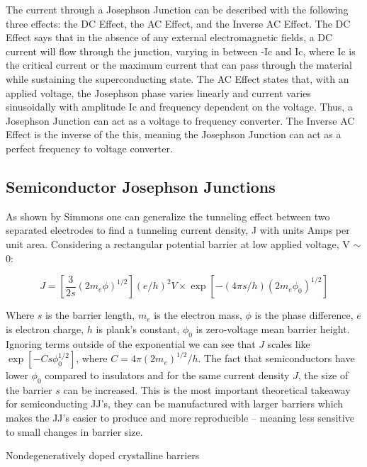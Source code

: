 \documentclass[conf]{new-aiaa}
\begin{document}
The current through a Josephson Junction can be described with the following three effects: the DC Effect, the AC Effect, and the Inverse AC Effect. The DC Effect says that in the absence of any external electromagnetic fields, a DC current will flow through the junction, varying in between -Ic and Ic, where Ic is the critical current or the maximum current that can pass through the material while sustaining the superconducting state. The AC Effect states that, with an applied voltage, the Josephson phase varies linearly and current varies sinusoidally with amplitude Ic and frequency dependent on the voltage. Thus, a Josephson Junction can act as a voltage to frequency converter. The Inverse AC Effect is the inverse of the this, meaning the Josephson Junction can act as a perfect frequency to voltage converter. 



\subsection{Semiconductor Josephson Junctions}

As shown by Simmons \cite{simmons1963generalized} one can generalize the tunneling effect between two separated electrodes to find a tunneling current density, J with units Amps per unit area. Considering a rectangular potential barrier at low applied voltage, V $\sim$ 0:

\begin{equation}
    J = \left[\frac{3}{2s} (2m_e \phi )^{1/2}\right](e/h)^2 V \times \exp{[-(4 \pi s/h)(2 m_e \phi_0)^{1/2}]}
\end{equation}

Where $s$ is the barrier length, $m_e$ is the electron mass, $\phi$ is the phase difference, $e$ is electron charge, $h$ is plank's constant, $\phi_0$ is zero-voltage mean barrier height. Ignoring terms outside of the exponential we can see that $J$ scales like $\exp{[- C s \phi_0 ^{1/2}]}$, where $C = 4 \pi (2m_e)^{1/2}/h$. The fact that semiconductors have lower $\phi_0$ compared to insulators and for the same current density $J$, the size of the barrier $s$ can be increased. This is the most important theoretical takeaway for semiconducting JJ's, they can be manufactured with larger barriers which makes the JJ's easier to produce and more reproducible -- meaning less sensitive to small changes in barrier size.



Nondegeneratively doped crystalline barriers
\end{document}
